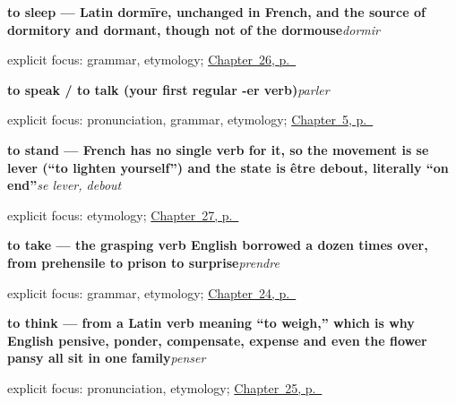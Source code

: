 \noindent\begin{minipage}[t]{\linewidth}
\raggedright
\textbf{to sleep — Latin dormīre, unchanged in French, and the source of dormitory and dormant, though not of the dormouse}\enspace\emph{dormir}\par
\footnotesize explicit focus: grammar, etymology; \hyperref[ch:fr-hearing-sleeping-walking-running]{Chapter~26, p.~\pageref*{ch:fr-hearing-sleeping-walking-running}}
\end{minipage}\par\smallskip

\noindent\begin{minipage}[t]{\linewidth}
\raggedright
\textbf{to speak / to talk (your first regular -er verb)}\enspace\emph{parler}\par
\footnotesize explicit focus: pronunciation, grammar, etymology; \hyperref[ch:first-verbs]{Chapter~5, p.~\pageref*{ch:first-verbs}}
\end{minipage}\par\smallskip

\noindent\begin{minipage}[t]{\linewidth}
\raggedright
\textbf{to stand — French has no single verb for it, so the movement is se lever (\textquotedblleft{}to lighten yourself\textquotedblright{}) and the state is être debout, literally \textquotedblleft{}on end\textquotedblright{}}\enspace\emph{se lever, debout}\par
\footnotesize explicit focus: etymology; \hyperref[ch:fr-sitting-standing-opening-closing]{Chapter~27, p.~\pageref*{ch:fr-sitting-standing-opening-closing}}
\end{minipage}\par\smallskip

\noindent\begin{minipage}[t]{\linewidth}
\raggedright
\textbf{to take — the grasping verb English borrowed a dozen times over, from prehensile to prison to surprise}\enspace\emph{prendre}\par
\footnotesize explicit focus: grammar, etymology; \hyperref[ch:fr-taking-asking-helping-loving]{Chapter~24, p.~\pageref*{ch:fr-taking-asking-helping-loving}}
\end{minipage}\par\smallskip

\noindent\begin{minipage}[t]{\linewidth}
\raggedright
\textbf{to think — from a Latin verb meaning \textquotedblleft{}to weigh,\textquotedblright{} which is why English pensive, ponder, compensate, expense and even the flower pansy all sit in one family}\enspace\emph{penser}\par
\footnotesize explicit focus: pronunciation, etymology; \hyperref[ch:fr-verbs-of-the-mind]{Chapter~25, p.~\pageref*{ch:fr-verbs-of-the-mind}}
\end{minipage}\par\smallskip

